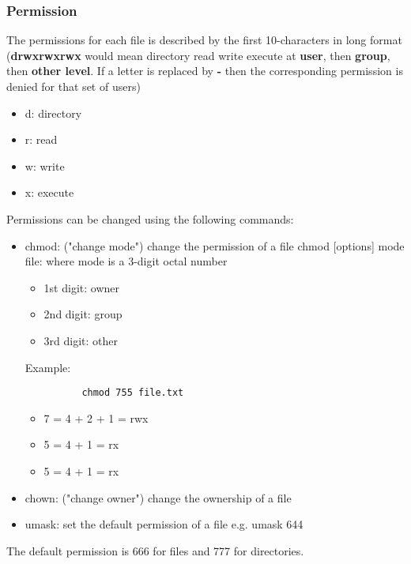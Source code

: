 \documentclass[12pt,a4paper]{article}
\begin{document}
\subsubsection{Permission}
The permissions for each file is described by the first 10-characters in long format (\textbf{drwxrwxrwx} would mean directory read write execute at \textbf{user}, then \textbf{group}, then \textbf{other level}. If a letter is replaced by \textbf{-} then the corresponding permission is denied for that set of users)
\begin{itemize}
    \item d: directory
    \item r: read
    \item w: write
    \item x: execute
\end{itemize}
Permissions can be changed using the following commands:
\begin{itemize}
    \item chmod: ("change mode") change the permission of a file
    chmod [options] mode file: where mode is a 3-digit octal number
    \begin{itemize}
        \item 1st digit: owner
        \item 2nd digit: group
        \item 3rd digit: other
    \end{itemize}
    Example: 
    \begin{lstlisting}
          chmod 755 file.txt
    \end{lstlisting}
    \begin{itemize}
        \item 7 = 4 + 2 + 1 = rwx
        \item 5 = 4 + 1 = rx
        \item 5 = 4 + 1 = rx
    \end{itemize}
    \item chown: ("change owner") change the ownership of a file
    \item umask: set the default permission of a file
    e.g. umask 644
\end{itemize}
The default permission is 666 for files and 777 for directories.\\
\end{document}
